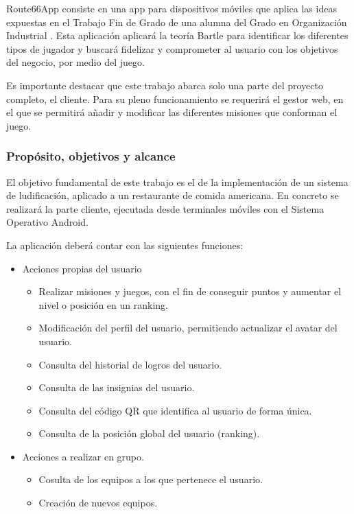 \documentclass[twoside]{report}
\begin{document}
Route66App consiste en una app para dispositivos móviles que aplica las ideas expuestas en el Trabajo Fin de Grado de una alumna del Grado en Organización Industrial \cite{cristinatfg}. Esta aplicación aplicará la teoría Bartle para identificar los diferentes tipos de jugador y buscará fidelizar y comprometer al usuario con los objetivos del negocio, por medio del juego.

Es importante destacar que este trabajo abarca solo una parte del proyecto completo, el cliente. Para su pleno funcionamiento se requerirá el gestor web, en el que se permitirá añadir y modificar las diferentes misiones que conforman el juego. 
 
\subsubsection{Propósito, objetivos y alcance}

El objetivo fundamental de  este trabajo es el de la implementación de un sistema de ludificación, aplicado a un restaurante de comida americana. En concreto se realizará la parte cliente, ejecutada desde terminales móviles con el Sistema Operativo Android.

La aplicación deberá contar con las siguientes funciones:
\begin{itemize}
\item Acciones propias del usuario
	\begin{itemize}
	\item Realizar misiones y juegos, con el fin de conseguir puntos y aumentar el nivel o posición en un ranking.
	\item Modificación del perfil del usuario, permitiendo actualizar el avatar del usuario.
	\item Consulta del historial de logros del usuario.
	\item Consulta de las insignias del usuario.
	\item Consulta del código QR que identifica al usuario de forma única.
	\item Consulta de la posición global del usuario (ranking).
	\end{itemize}
\item Acciones a realizar en grupo.
	\begin{itemize}
	\item Cosulta de los equipos a los que pertenece el usuario.
	\item Creación de nuevos equipos.
	\end{itemize}
\end{itemize}
\end{document}
